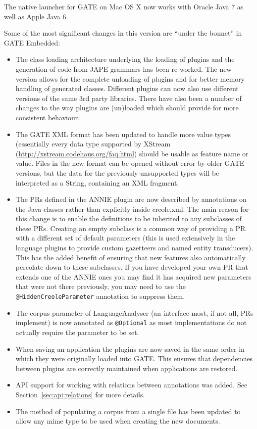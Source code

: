 The native launcher for GATE on Mac OS X now works with Oracle Java 7 as well
as Apple Java 6.


Some of the most significant changes in this version are ``under the bonnet''
in GATE Embedded:
\begin{itemize}
\item The class loading architecture underlying the loading of plugins and the
  generation of code from JAPE grammars has been re-worked. The new version
  allows for the complete unloading of plugins and for better memory handling of
  generated classes. Different plugins can now also use different versions of the
  same 3rd party libraries. There have also been a number of changes to the way
  plugins are (un)loaded which should provide for more consistent behaviour.
\item The GATE XML format has been updated to handle more value types
  (essentially every data type supported by XStream
  (\url{http://xstream.codehaus.org/faq.html}) should be usable as feature name
  or value. Files in the new format can be opened without error by older GATE
  versions, but the data for the previously-unsupported types will be
  interpreted as a String, containing an XML fragment.
\item The PRs defined in the ANNIE plugin are now described by annotations on
  the Java classes rather than explicitly inside creole.xml. The main reason for
  this change is to enable the definitions to be inherited to any subclasses of
  these PRs. Creating an empty subclass is a common way of providing a PR with a
  different set of default parameters (this is used extensively in the language
  plugins to provide custom gazetteers and named entity transducers). This has
  the added benefit of ensuring that new features also automatically percolate
  down to these subclasses.  If you have developed your own PR that extends one
  of the ANNIE ones you may find it has acquired new parameters that were not
  there previously, you may need to use the \verb!@HiddenCreoleParameter!
  annotation to suppress them.
\item The corpus parameter of LanguageAnalyser (an interface most, if not all,
  PRs implement) is now annotated as \verb|@Optional| as most implementations
  do not actually require the parameter to be set.
\item When saving an application the plugins are now saved in the same order in
  which they were originally loaded into GATE. This ensures that dependencies
  between plugins are correctly maintained when applications are restored.
\item API support for working with relations between annotations was added. See
  Section~\ref{sec:api:relations} for more details.
\item The method of populating a corpus from a single file has been updated to
  allow any mime type to be used when creating the new documents.
\end{itemize}


